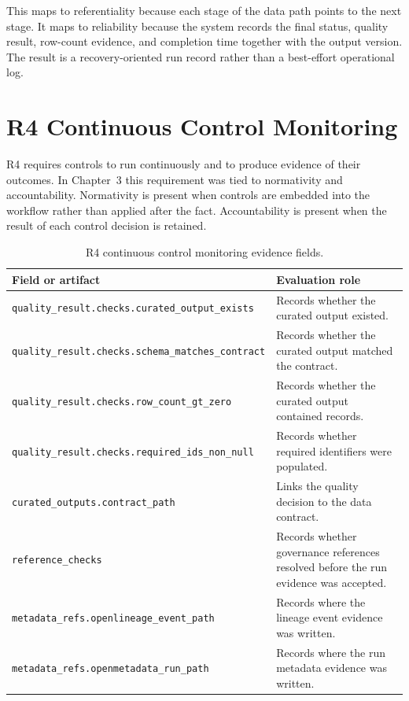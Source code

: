 This maps to referentiality because each stage of the data path points to the
next stage. It maps to reliability because the system records the final status,
quality result, row-count evidence, and completion time together with the
output version. The result is a recovery-oriented run record rather than a
best-effort operational log.

\section{R4 Continuous Control Monitoring}
\noindent
R4 requires controls to run continuously and to produce evidence of their
outcomes. In Chapter~3 this requirement was tied to normativity and
accountability. Normativity is present when controls are embedded into the
workflow rather than applied after the fact. Accountability is present when the
result of each control decision is retained.

\begin{table}[H]
  \centering
  \caption{R4 continuous control monitoring evidence fields.}
  \label{tab:evaluation-r4-fields}
  \renewcommand{\arraystretch}{1.15}
  \begin{tabularx}{\textwidth}{@{}p{}X@{}}
    \toprule
    \textbf{Field or artifact} & \textbf{Evaluation role} \\
    \midrule
    \texttt{quality\_result.checks.curated\_output\_exists} & Records whether the curated output existed. \\
    \texttt{quality\_result.checks.schema\_matches\_contract} & Records whether the curated output matched the contract. \\
    \texttt{quality\_result.checks.row\_count\_gt\_zero} & Records whether the curated output contained records. \\
    \texttt{quality\_result.checks.required\_ids\_non\_null} & Records whether required identifiers were populated. \\
    \texttt{curated\_outputs.contract\_path} & Links the quality decision to the data contract. \\
    \texttt{reference\_checks} & Records whether governance references resolved before the run evidence was accepted. \\
    \texttt{metadata\_refs.openlineage\_event\_path} & Records where the lineage event evidence was written. \\
    \texttt{metadata\_refs.openmetadata\_run\_path} & Records where the run metadata evidence was written. \\
    \bottomrule
  \end{tabularx}
\end{table}

